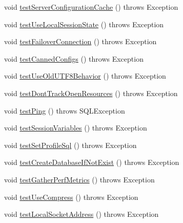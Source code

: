 \begin{DoxyCompactItemize}
\item 
void \mbox{\hyperlink{classtestsuite_1_1simple_1_1_connection_test_a6fa3bc9c7ac7d02ffdc0856f8cf72f91}{test\+Server\+Configuration\+Cache}} ()  throws Exception 
\item 
void \mbox{\hyperlink{classtestsuite_1_1simple_1_1_connection_test_abaf8e563e167bfb40021b103f3cccd70}{test\+Use\+Local\+Session\+State}} ()  throws Exception 
\item 
void \mbox{\hyperlink{classtestsuite_1_1simple_1_1_connection_test_a6e0b85502950068c4a43a70f70f93a56}{test\+Failover\+Connection}} ()  throws Exception 
\item 
void \mbox{\hyperlink{classtestsuite_1_1simple_1_1_connection_test_a00b269a0035eddf1f921422e0e01c4e2}{test\+Canned\+Configs}} ()  throws Exception 
\item 
void \mbox{\hyperlink{classtestsuite_1_1simple_1_1_connection_test_a55c54f86b4450240678a5ed9eb986b8a}{test\+Use\+Old\+U\+T\+F8\+Behavior}} ()  throws Exception 
\item 
void \mbox{\hyperlink{classtestsuite_1_1simple_1_1_connection_test_a018eaff5a1cc1db390b843a77c50d63f}{test\+Dont\+Track\+Open\+Resources}} ()  throws Exception 
\item 
void \mbox{\hyperlink{classtestsuite_1_1simple_1_1_connection_test_a532ba6cd7d05b27ab48c9c6024baeca6}{test\+Ping}} ()  throws S\+Q\+L\+Exception 
\item 
void \mbox{\hyperlink{classtestsuite_1_1simple_1_1_connection_test_aa0fe29922fbe1bc8263651e579788c61}{test\+Session\+Variables}} ()  throws Exception 
\item 
void \mbox{\hyperlink{classtestsuite_1_1simple_1_1_connection_test_a279c085ad223ecdc6dc0a53ed7d73abb}{test\+Set\+Profile\+Sql}} ()  throws Exception 
\item 
void \mbox{\hyperlink{classtestsuite_1_1simple_1_1_connection_test_a0293a623600d8ff3ca51a6830f46dea2}{test\+Create\+Database\+If\+Not\+Exist}} ()  throws Exception 
\item 
void \mbox{\hyperlink{classtestsuite_1_1simple_1_1_connection_test_a3efc92c350b402367a66355fe3305381}{test\+Gather\+Perf\+Metrics}} ()  throws Exception 
\item 
void \mbox{\hyperlink{classtestsuite_1_1simple_1_1_connection_test_ab5c3f7762742c5135e360e5ad11f59e5}{test\+Use\+Compress}} ()  throws Exception 
\item 
void \mbox{\hyperlink{classtestsuite_1_1simple_1_1_connection_test_af716a61440ab4bf588f5160f6ca5aafb}{test\+Local\+Socket\+Address}} ()  throws Exception 

\end{DoxyCompactItemize}
